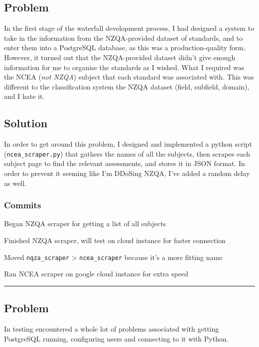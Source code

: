\documentclass{article}
\begin{document}
\subsection*{Problem}
In the first stage of the waterfall development process, I had designed a system to take in the information from the NZQA-provided dataset of standards, and to enter them into a PostgreSQL database, as this was a production-quality form. However, it turned out that the NZQA-provided dataset didn’t give enough information for me to organise the standards as I wished. What I required was the NCEA (\textit{not NZQA}) subject that each standard was associated with. This was different to the classification system the NZQA dataset (field, subfield, domain), and I hate it.
\subsection*{Solution}
In order to get around this problem, I designed and implemented a python script (\texttt{ncea\_scraper.py}) that gathers the names of all the subjects, then scrapes each subject page to find the relevant assessments, and stores it in JSON format. In order to prevent it seeming like I'm DDoSing NZQA, I've added a random delay as well.
\subsubsection*{Commits}
\begin{description}\small
    \item[\texttt{f8fd2a2}] Began NZQA scraper for getting a list of all subjects
    \item[\texttt{9b4c0a6}] Finished NZQA scraper, will test on cloud instance for faster connection
    \item[\texttt{419f833}] Moved \texttt{nqza\_scraper} > \texttt{ncea\_scraper} because it's a more fitting name
    \item[\texttt{f065d95}] Ran NCEA scraper on google cloud instance for extra speed
\end{description}
\normalfont
\begin{center}
\rule{0.5\textwidth}{0.2pt}
\end{center}

\subsection*{Problem}
In testing encountered a whole lot of problems associated with getting PostgreSQL running, configuring users and connecting to it with Python.
\end{document}
